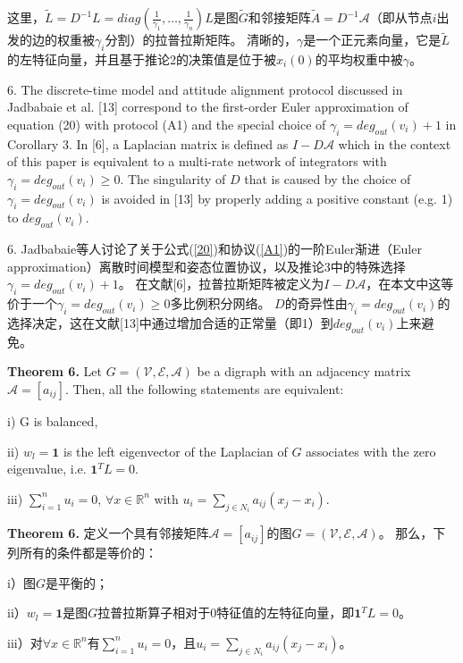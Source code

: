 \documentclass{article}
\begin{document}
\noindent 这里，$\tilde{L} = D^{-1}L = diag(\frac{1}{\gamma_1},\dots,\frac{1}{\gamma_n})L$是图$\tilde{G}$和邻接矩阵$\tilde{A}=D^{-1}\mathcal{A}$（即从节点$i$出发的边的权重被$\gamma_i$分割）的拉普拉斯矩阵。
清晰的，$\gamma$是一个正元素向量，它是$\tilde{L}$的左特征向量，并且基于推论2的决策值是位于被$x_i(0)$的平均权重中被$\gamma$。

{\color[gray]{0.5}
 6. The discrete-time model and attitude alignment protocol discussed in Jadbabaie et al. [13] correspond to the ﬁrst-order Euler approximation of equation (20) with protocol (A1) and the special choice of $\gamma_i=deg_{out}(v_i)+1$ in Corollary 3. 
In [6], a Laplacian matrix is deﬁned as $I-D\mathcal{A}$ which in the context of this paper is equivalent to a multi-rate network of integrators with $\gamma_i=deg_{out}(v_i)\ge 0$. 
The singularity of $D$ that is caused by the choice of $\gamma_i=deg_{out}(v_i)$ is avoided in [13] by properly adding a positive constant (e.g. 1) to $deg_{out}(v_i)$.
}

 6. Jadbabaie等人讨论了关于公式(\ref{20})和协议(\ref{A1})的一阶Euler渐进（Euler approximation）离散时间模型和姿态位置协议，以及推论3中的特殊选择$\gamma_i=deg_{out}(v_i)+1$。
在文献[6]，拉普拉斯矩阵被定义为$I-D\mathcal{A}$，在本文中这等价于一个$\gamma_i=deg_{out}(v_i)\ge 0$多比例积分网络。
$D$的奇异性由$\gamma_i=deg_{out}(v_i)$的选择决定，这在文献[13]中通过增加合适的正常量（即1）到$deg_{out}(v_i)$上来避免。

{\color[gray]{0.5}
\noindent \textbf{Theorem 6.} Let $G=(\mathcal{V}, \mathcal{E}, \mathcal{A})$ be a digraph with an adjacency matrix $\mathcal{A}=[a_{ij}]$. 
Then, all the following statements are equivalent:

i) G is balanced, 

ii) $w_l = \mathbf{1}$ is the left eigenvector of the Laplacian of $G$ associates with the zero eigenvalue, i.e. $\mathbf{1}^TL = 0$.

iii) $\sum_{i=1}^n u_i = 0$, $\forall x \in \mathbb{R}^n$ with $u_i = \sum_{j\in N_i}a_{ij}(x_j - x_i)$.
}

\noindent \textbf{Theorem 6.} 定义一个具有邻接矩阵$\mathcal{A}=[a_{ij}]$的图$G=(\mathcal{V}, \mathcal{E}, \mathcal{A})$。
那么，下列所有的条件都是等价的：

i）图$G$是平衡的；

ii）$w_l = \mathbf{1}$是图$G$拉普拉斯算子相对于0特征值的左特征向量，即$\mathbf{1}^TL = 0$。

iii）对$\forall x \in \mathbb{R}^n$有$\sum_{i=1}^n u_i = 0$，且$u_i = \sum_{j\in N_i}a_{ij}(x_j - x_i)$。
\end{document}
